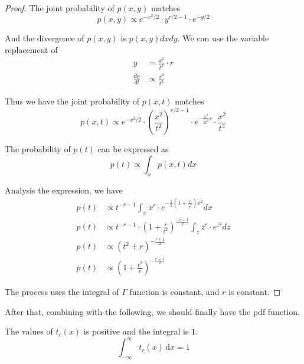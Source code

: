 \begin{proof}
    The joint probability of $p(x, y)$ matches
    \begin{equation*}
        p(x, y) \propto e^{-x^2/2} \cdot y^{r/2-1} \cdot e^{-y/2}
    \end{equation*}

    And the divergence of $p(x, y)$ is $p(x, y) dx dy$.
    We can use the variable replacement of
    \begin{align*}
        y             & = \frac{x^2}{t^2} \cdot r \\
        \frac{dy}{dt} & \propto \frac{x^2}{t^3}
    \end{align*}

    Thus we have the joint probability of $p(x, t)$ matches
    \begin{equation*}
        p(x, t) \propto e^{-x^2/2} \cdot (\frac{x^2}{t^2})^{r/2-1} \cdot e^{-\frac{x^2}{2t^2}r} \cdot \frac{x^2}{t^3}
    \end{equation*}

    The probability of $p(t)$ can be expressed as
    \begin{equation*}
        p(t) \propto \int_{x} p(x, t) dx
    \end{equation*}

    Analysis the expression, we have
    \begin{align*}
        p(t) & \propto t^{-r-1} \int_{x} x^{r} \cdot e^{-\frac{1}{2}(1+\frac{r}{t^2})x^2} dx           \\
        p(t) & \propto t^{-r-1} \cdot (1+\frac{r}{t^2})^\frac{-r-1}{2} \int_{z} z^{r} \cdot e^{z^2} dz \\
        p(t) & \propto (t^2 + r) ^ {-\frac{r+1}{2}}                                                    \\
        p(t) & \propto (1+\frac{t^2}{r})^{-\frac{r+1}{2}}
    \end{align*}

    The process uses the integral of $\Gamma$ function is constant, and $r$ is constant.
\end{proof}


After that, combining with the following, we should finally have the pdf function.

\begin{lemma}
    \label{lemma: Pdf of Student's T Distribution is a Pdf}
    The values of $t_r(x)$ is positive and the integral is $1$.
    \begin{equation*}
        \int_{-\infty}^{\infty} t_r(x) \,\mathrm{d}x = 1
    \end{equation*}

\end{lemma}


